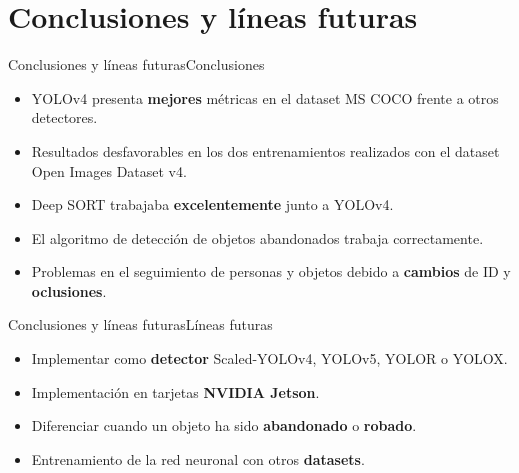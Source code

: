 \section{Conclusiones y líneas futuras}
\begin{frame}{Conclusiones y líneas futuras}{Conclusiones}

\begin{itemize}
  \setlength\itemsep{1.5em}
  \justifying
  \item YOLOv4 presenta \textbf{mejores} métricas en el dataset MS COCO frente a otros detectores. 
  \item Resultados desfavorables en los dos entrenamientos realizados con el dataset Open Images Dataset v4.
  \item Deep SORT trabajaba \textbf{excelentemente} junto a YOLOv4.
  \item El algoritmo de detección de objetos abandonados trabaja correctamente.
  \item Problemas en el seguimiento de personas y objetos debido a \textbf{cambios} de ID y \textbf{oclusiones}.
\end{itemize}

\end{frame}


\begin{frame}{Conclusiones y líneas futuras}{Líneas futuras}

\begin{itemize}
  \setlength\itemsep{2em}
  \justifying
  \item Implementar como \textbf{detector} Scaled-YOLOv4, YOLOv5, YOLOR o YOLOX. 
  \item Implementación en tarjetas \textbf{NVIDIA Jetson}.
  \item Diferenciar cuando un objeto ha sido \textbf{abandonado} o \textbf{robado}.
  \item Entrenamiento de la red neuronal con otros \textbf{datasets}.
\end{itemize}

\end{frame}
